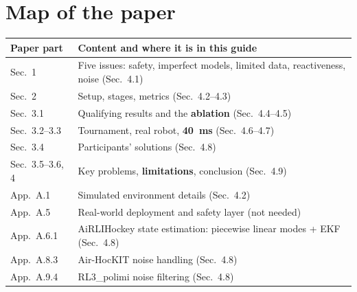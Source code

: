 \documentclass[11pt,a4paper]{article}
\begin{document}
\section{Map of the paper}
\begin{center}
\small
\begin{tabularx}{\textwidth}{@{}l X@{}}
\toprule
Paper part & Content and where it is in this guide \\
\midrule
Sec.~1 & Five issues: safety, imperfect models, limited data, reactiveness, noise (Sec.~4.1) \\
Sec.~2 & Setup, stages, metrics (Sec.~4.2--4.3) \\
Sec.~3.1 & Qualifying results and the \textbf{ablation} (Sec.~4.4--4.5) \\
Sec.~3.2--3.3 & Tournament, real robot, \textbf{40~ms} (Sec.~4.6--4.7) \\
Sec.~3.4 & Participants' solutions (Sec.~4.8) \\
Sec.~3.5--3.6, 4 & Key problems, \textbf{limitations}, conclusion (Sec.~4.9) \\
App.~A.1 & Simulated environment details (Sec.~4.2) \\
App.~A.5 & Real-world deployment and safety layer (not needed) \\
App.~A.6.1 & AiRLIHockey state estimation: piecewise linear modes + EKF (Sec.~4.8) \\
App.~A.8.3 & Air-HocKIT noise handling (Sec.~4.8) \\
App.~A.9.4 & RL3\_polimi noise filtering (Sec.~4.8) \\
\bottomrule
\end{tabularx}
\end{center}
\end{document}
